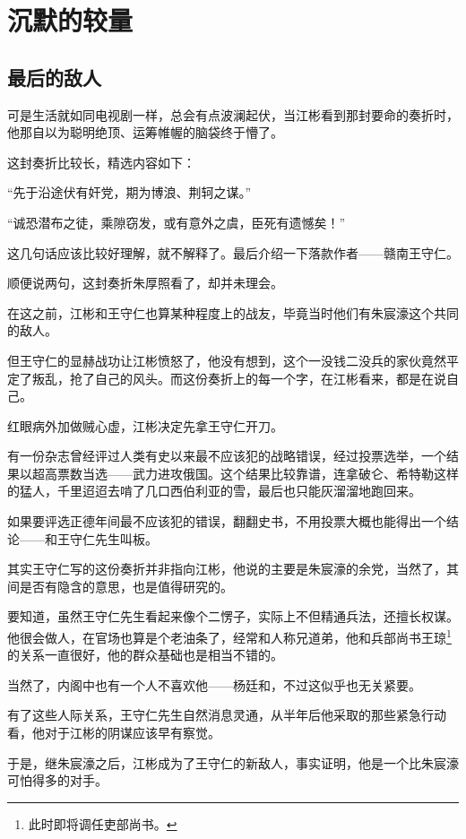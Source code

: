 \section{沉默的较量}
\ifnum{}
	\begin{multicols}{\theparacolNo}
\fi
\subsection{最后的敌人}
可是生活就如同电视剧一样，总会有点波澜起伏，当江彬看到那封要命的奏折时，他那自以为聪明绝顶、运筹帷幄的脑袋终于懵了。

这封奏折比较长，精选内容如下：

“先于沿途伏有奸党，期为博浪、荆轲之谋。”

“诚恐潜布之徒，乘隙窃发，或有意外之虞，臣死有遗憾矣！”

这几句话应该比较好理解，就不解释了。最后介绍一下落款作者——赣南王守仁。

顺便说两句，这封奏折朱厚照看了，却并未理会。

在这之前，江彬和王守仁也算某种程度上的战友，毕竟当时他们有朱宸濠这个共同的敌人。

但王守仁的显赫战功让江彬愤怒了，他没有想到，这个一没钱二没兵的家伙竟然平定了叛乱，抢了自己的风头。而这份奏折上的每一个字，在江彬看来，都是在说自己。

红眼病外加做贼心虚，江彬决定先拿王守仁开刀。

有一份杂志曾经评过人类有史以来最不应该犯的战略错误，经过投票选举，一个结果以超高票数当选——武力进攻俄国。这个结果比较靠谱，连拿破仑、希特勒这样的猛人，千里迢迢去啃了几口西伯利亚的雪，最后也只能灰溜溜地跑回来。

如果要评选正德年间最不应该犯的错误，翻翻史书，不用投票大概也能得出一个结论——和王守仁先生叫板。

其实王守仁写的这份奏折并非指向江彬，他说的主要是朱宸濠的余党，当然了，其间是否有隐含的意思，也是值得研究的。

要知道，虽然王守仁先生看起来像个二愣子，实际上不但精通兵法，还擅长权谋。他很会做人，在官场也算是个老油条了，经常和人称兄道弟，他和兵部尚书王琼\footnote{此时即将调任吏部尚书。}的关系一直很好，他的群众基础也是相当不错的。

当然了，内阁中也有一个人不喜欢他——杨廷和，不过这似乎也无关紧要。

有了这些人际关系，王守仁先生自然消息灵通，从半年后他采取的那些紧急行动看，他对于江彬的阴谋应该早有察觉。

于是，继朱宸濠之后，江彬成为了王守仁的新敌人，事实证明，他是一个比朱宸濠可怕得多的对手。


\end{multicols}
